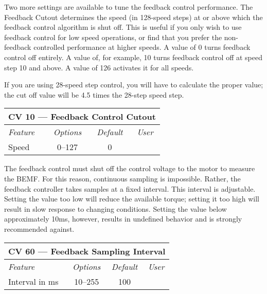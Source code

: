\documentclass[12pt,letterpaper,draft]{memoir} %
\begin{document}
\label{FeedbackActivation}Two more settings are available to tune the feedback control performance. The Feedback Cutout determines the speed (in 128-speed steps) at or above which the feedback control algorithm is shut off. This is useful if you only wish to use feedback control for low speed operations, or find that you prefer the non-feedback controlled performance at higher speeds. A value of 0 turns feedback control off entirely. A value of, for example, 10 turns feedback control off at speed step 10 and above. A value of 126 activates it for all speeds.

If you are using 28-speed step control, you will have to calculate the proper value; the cut off value will be 4.5 times the 28-step speed step.

\label{CV10}
\begin{center}
\begin{tabular}{|l|c|c|c|}
\hline
\multicolumn{4}{|c|}{\textbf{CV 10 --- Feedback Control Cutout}} \\ \hline \hline
\textit{Feature} & \textit{Options} & \textit{Default} & \textit{User} \\ \hline
Speed & 0--127 & 0 &\\ \hline
\end{tabular}
\end{center}

The feedback control must shut off the control voltage to the motor to measure the BEMF. For this reason, continuous sampling is impossible. Rather, the feedback controller takes samples at a fixed interval. This interval is adjustable. Setting the value too low will reduce the available torque; setting it too high will result in slow response to changing conditions. Setting the value below approximately 10ms, however, results in undefined behavior and is strongly recommended against.

\label{CV60}
\begin{center}
\begin{tabular}{|l|c|c|c|}
\hline
\multicolumn{4}{|c|}{\textbf{CV 60 --- Feedback Sampling Interval}} \\ \hline \hline
\textit{Feature} & \textit{Options} & \textit{Default} & \textit{User} \\ \hline
Interval in ms & 10--255 & 100 &\\ \hline
\end{tabular}
\end{center}
\end{document}
